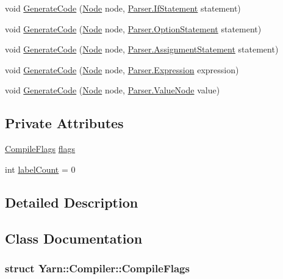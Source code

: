 \begin{DoxyCompactItemize}
void \hyperlink{a00034_a6ab14514a3b0644ae39c626e5e5e180d}{Generate\-Code} (\hyperlink{a00031_dd/de2/a00320}{Node} node, \hyperlink{a00094}{Parser.\-If\-Statement} statement)
\item 
void \hyperlink{a00034_a5cb3cbcd9727bdef018ec5299bd13142}{Generate\-Code} (\hyperlink{a00031_dd/de2/a00320}{Node} node, \hyperlink{a00120}{Parser.\-Option\-Statement} statement)
\item 
void \hyperlink{a00034_afb86d9228f66896abe31d47d72a267ce}{Generate\-Code} (\hyperlink{a00031_dd/de2/a00320}{Node} node, \hyperlink{a00020}{Parser.\-Assignment\-Statement} statement)
\item 
void \hyperlink{a00034_a5c762915320958c3a03b193b06a7e279}{Generate\-Code} (\hyperlink{a00031_dd/de2/a00320}{Node} node, \hyperlink{a00082}{Parser.\-Expression} expression)
\item 
void \hyperlink{a00034_a41438a0b25f2668a180372d05127d891}{Generate\-Code} (\hyperlink{a00031_dd/de2/a00320}{Node} node, \hyperlink{a00164}{Parser.\-Value\-Node} value)
\end{DoxyCompactItemize}
\subsection*{Private Attributes}
\begin{DoxyCompactItemize}
\item 
\hyperlink{a00034_d3/db8/a00316}{Compile\-Flags} \hyperlink{a00034_a541022d89bcf9bc8f794eb6d6b438d08}{flags}
\item 
int \hyperlink{a00034_a87758397eba2e84cda8e0d6c40656f3f}{label\-Count} = 0
\end{DoxyCompactItemize}


\subsection{Detailed Description}


\subsection{Class Documentation}
\label{d3/db8/a00316}
\hypertarget{a00034_d3/db8/a00316}{}
\subsubsection{struct Yarn\-:\-:Compiler\-:\-:Compile\-Flags}


